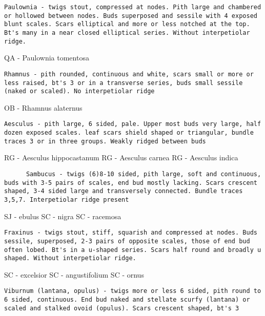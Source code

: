 \documentclass[openany]{book}
\begin{document}
\begin{verbatim}
Paulownia - twigs stout, compressed at nodes. Pith large and chambered or hollowed between nodes. Buds superposed and sessile with 4 exposed blunt scales. Scars elliptical and more or less notched at the top. Bt's many in a near closed elliptical series. Without interpetiolar ridge.
\end{verbatim}

QA - Paulownia tomentosa

\begin{verbatim}
Rhamnus - pith rounded, continuous and white, scars small or more or less raised, bt's 3 or in a transverse series, buds small sessile (naked or scaled). No interpetiolar ridge
\end{verbatim}

OB - Rhamnus alaternus

\begin{verbatim}
Aesculus - pith large, 6 sided, pale. Upper most buds very large, half dozen exposed scales. leaf scars shield shaped or triangular, bundle traces 3 or in three groups. Weakly ridged between buds
\end{verbatim}

RG - Aesculus hippocastanum RG - Aesculus carnea RG - Aesculus indica

\begin{verbatim}
      Sambucus - twigs (6)8-10 sided, pith large, soft and continuous, buds with 3-5 pairs of scales, end bud mostly lacking. Scars crescent shaped, 3-4 sided large and transversely connected. Bundle traces 3,5,7. Interpetiolar ridge present
\end{verbatim}

SJ - ebulus SC - nigra SC - racemosa

\begin{verbatim}
Fraxinus - twigs stout, stiff, squarish and compressed at nodes. Buds sessile, superposed, 2-3 pairs of opposite scales, those of end bud often lobed. Bt's in a u-shaped series. Scars half round and broadly u shaped. Without interpetiolar ridge.
\end{verbatim}

SC - excelsior SC - angustifolium SC - ornus

\begin{verbatim}
Viburnum (lantana, opulus) - twigs more or less 6 sided, pith round to 6 sided, continuous. End bud naked and stellate scurfy (lantana) or scaled and stalked ovoid (opulus). Scars crescent shaped, bt's 3
\end{verbatim}
\end{document}
